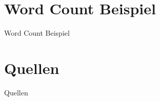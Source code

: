 \documentclass{beamer}
\begin{document}
\section{Word Count Beispiel}
\begin{frame}[t]{Word Count Beispiel}
\end{frame}

\section{Quellen}
\begin{frame}[t]{Quellen}
\end{frame}
\end{document}
